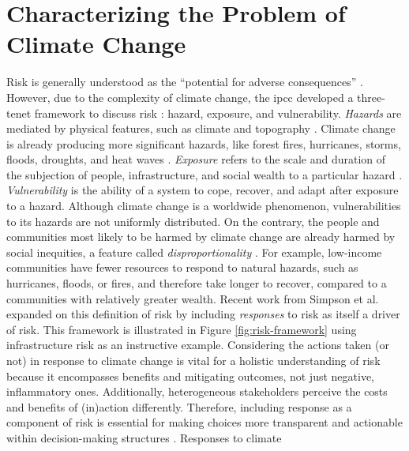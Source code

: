 \section{Characterizing the Problem of Climate Change}
\label{section:climate-change-risk}

Risk is generally understood as the ``potential for adverse consequences''
\cite{reisinger_concept_2020}. However, due to the complexity of climate change,
the \ac{ipcc} developed a three-tenet framework to discuss risk
\cite{reisinger_concept_2020}: hazard, exposure, and vulnerability.
\textit{Hazards} are mediated by physical features, such as climate and
topography \cite{dorkenoo_critical_2022,simpson_framework_2021}.  Climate change
is already producing more significant hazards, like forest fires, hurricanes,
storms, floods, droughts, and heat waves
\cite{reidmiller_fourth_2018,intergovernmental_panel_on_climate_change_climate_2021,dahl_killer_2019}.
\textit{Exposure} refers to the scale and duration of the subjection of people,
infrastructure, and social wealth to a particular hazard
\cite{simpson_framework_2021,reisinger_concept_2020,li_understanding_2021}.
\textit{Vulnerability} is the ability of a system to cope, recover, and adapt
after exposure to a hazard. Although climate change is a worldwide phenomenon,
vulnerabilities to its hazards are not uniformly distributed. On the contrary,
the people and communities most likely to be harmed by climate change are
already harmed by social inequities, a feature called
\textit{disproportionality} \cite{islam_climate_2017}. For example, low-income
communities have fewer resources to respond to natural hazards, such as
hurricanes, floods, or fires, and therefore take longer to recover, compared to
a communities with relatively greater wealth. Recent work from Simpson et al.
\cite{simpson_framework_2021} expanded on this definition of risk by including
\textit{responses} to risk as itself a driver of risk. This framework is
illustrated in Figure \ref{fig:risk-framework} using infrastructure risk as an
instructive example. Considering the actions taken (or not) in response to
climate change is vital for a holistic understanding of risk because it
encompasses benefits and mitigating outcomes, not just negative, inflammatory
ones. Additionally, heterogeneous stakeholders perceive the costs and benefits
of (in)action differently. Therefore, including response as a component of risk
is essential for making choices more transparent and actionable within
decision-making structures \cite{simpson_framework_2021}. Responses to climate
